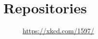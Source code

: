 \section{Repositories}
\begin{frame}
	\begin{figure}
		\centering
		\caption{\url{https://xkcd.com/1597/}}
	\end{figure}
\end{frame}
